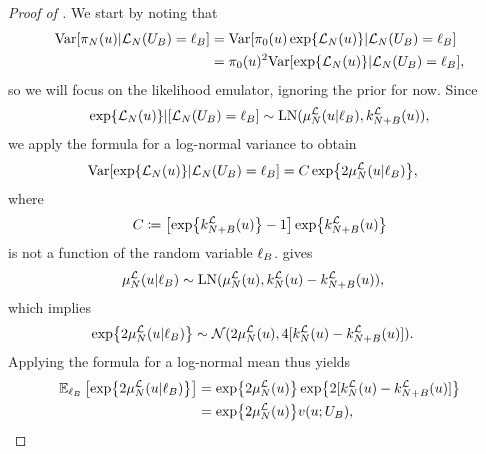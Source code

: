 \documentclass[12pt]{article}
\begin{document}
\begin{proof} [Proof of ]
We start by noting that 
\begin{align*}
\Var[\llikEmRdmDens[\Ndesign](\Par) | \llikEm[\Ndesign](\designBatchIn) = \designBatchLlik]
&= \Var[\priorDens(\Par) \Exp{\llikEm(\Par)} | \llikEm[\Ndesign](\designBatchIn) = \designBatchLlik] \\
&= \priorDens(\Par)^2 \Var[\Exp{\llikEm(\Par)} | \llikEm[\Ndesign](\designBatchIn) = \designBatchLlik],
\end{align*}
so we will focus on the likelihood emulator, ignoring the prior for now. Since 
\begin{align*}
\Exp{\llikEm(\Par)} | [\llikEm[\Ndesign](\designBatchIn) = \designBatchLlik] \sim 
\LN(\emMean[\Ndesign]{\llik}(\Par| \designBatchLlik), \emKer[\Naugment]{\llik}(\Par)),
\end{align*}
we apply the formula for a log-normal variance to obtain 
\begin{align}
\Var[\Exp{\llikEm(\Par)} | \llikEm[\Ndesign](\designBatchIn) = \designBatchLlik]
&= \cst \Exp{2\emMean[\Ndesign]{\llik}(\Par | \designBatchLlik)}, \label{formula_plug_in}
\end{align}
where 
\begin{align*}
\cst \Def \left[\Exp{\emKer[\Naugment]{\llik}(\Par)} -1 \right] \Exp{\emKer[\Naugment]{\llik}(\Par)}
\end{align*}
is not a function of the random variable $\designBatchLlik$.  gives 
\begin{align*}
\emMean[\Ndesign]{\llik}(\Par | \designBatchLlik)
&\sim \LN(\emMean[\Ndesign]{\llik}(\Par), \emKer[\Ndesign]{\llik}(\Par) - \emKer[\Naugment]{\llik}(\Par)), 
\end{align*}
which implies 
\begin{align*}
\Exp{2\emMean[\Ndesign]{\llik}(\Par | \designBatchLlik)}
&\sim \Gaussian(2\emMean[\Ndesign]{\llik}(\Par), 4[\emKer[\Ndesign]{\llik}(\Par) - \emKer[\Naugment]{\llik}(\Par)]).
\end{align*}
Applying the formula for a log-normal mean thus yields 
\begin{align*}
\E_{\designBatchLlik} \left[\Exp{2\emMean[\Ndesign]{\llik}(\Par | \designBatchLlik)} \right]
&= \Exp{2\emMean[\Ndesign]{\llik}(\Par)} \Exp{2[\emKer[\Ndesign]{\llik}(\Par) - \emKer[\Naugment]{\llik}(\Par)]} \\
&=  \Exp{2\emMean[\Ndesign]{\llik}(\Par)} \varInflation(\Par; \designBatchIn), 
\end{align*}

\end{proof}
\end{document}
